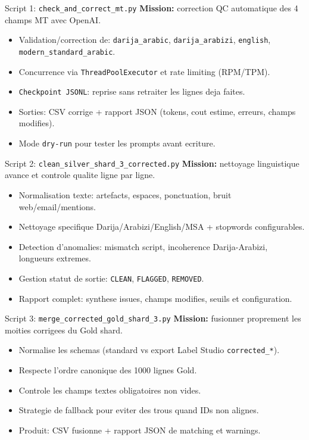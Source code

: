 \documentclass[10pt,aspectratio=169]{beamer}
\begin{document}
\begin{frame}{Script 1: \texttt{check\_and\_correct\_mt.py}}
  \textbf{Mission:} correction QC automatique des 4 champs MT avec OpenAI.

  \vspace{0.2cm}
  \begin{itemize}
    \item Validation/correction de: \texttt{darija\_arabic}, \texttt{darija\_arabizi}, \texttt{english}, \texttt{modern\_standard\_arabic}.
    \item Concurrence via \texttt{ThreadPoolExecutor} et rate limiting (RPM/TPM).
    \item \texttt{Checkpoint JSONL}: reprise sans retraiter les lignes deja faites.
    \item Sorties: CSV corrige + rapport JSON (tokens, cout estime, erreurs, champs modifies).
    \item Mode \texttt{dry-run} pour tester les prompts avant ecriture.
  \end{itemize}
\end{frame}

\begin{frame}{Script 2: \texttt{clean\_silver\_shard\_3\_corrected.py}}
  \textbf{Mission:} nettoyage linguistique avance et controle qualite ligne par ligne.

  \vspace{0.2cm}
  \begin{itemize}
    \item Normalisation texte: artefacts, espaces, ponctuation, bruit web/email/mentions.
    \item Nettoyage specifique Darija/Arabizi/English/MSA + stopwords configurables.
    \item Detection d'anomalies: mismatch script, incoherence Darija-Arabizi, longueurs extremes.
    \item Gestion statut de sortie: \texttt{CLEAN}, \texttt{FLAGGED}, \texttt{REMOVED}.
    \item Rapport complet: synthese issues, champs modifies, seuils et configuration.
  \end{itemize}
\end{frame}

\begin{frame}{Script 3: \texttt{merge\_corrected\_gold\_shard\_3.py}}
  \textbf{Mission:} fusionner proprement les moities corrigees du Gold shard.

  \vspace{0.2cm}
  \begin{itemize}
    \item Normalise les schemas (standard vs export Label Studio \texttt{corrected\_*}).
    \item Respecte l'ordre canonique des 1000 lignes Gold.
    \item Controle les champs textes obligatoires non vides.
    \item Strategie de fallback pour eviter des trous quand IDs non alignes.
    \item Produit: CSV fusionne + rapport JSON de matching et warnings.
  \end{itemize}
\end{frame}
\end{document}
